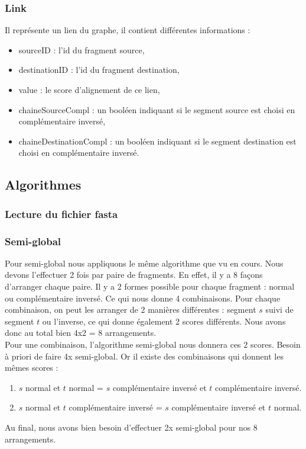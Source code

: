 \documentclass{article}
\begin{document}
\subsubsection{Link}
Il représente un lien du graphe, il contient différentes informations :
\begin{itemize}
\item sourceID : l'id du fragment source,
\item destinationID : l'id du fragment destination,
\item value : le score d'alignement de ce lien,
\item chaineSourceCompl : un booléen indiquant si le segment source est choisi en complémentaire inversé,
\item chaineDestinationCompl : un booléen indiquant si le segment destination est choisi en complémentaire inversé.
\end{itemize}


\subsection{Algorithmes}
\subsubsection{Lecture du fichier fasta}

\subsubsection{Semi-global}
Pour semi-global nous appliquons le même algorithme que vu en cours. Nous devons l'effectuer 2 fois par paire de fragments. En effet, il y a 8 façons d'arranger chaque paire. Il y a 2 formes possible pour chaque fragment : normal ou complémentaire inversé. Ce qui nous donne 4 combinaisons. Pour chaque combinaison, on peut les arranger de 2 manières différentes : segment $s$ suivi de segment $t$ ou l'inverse, ce qui donne également 2 scores différents. Nous avons donc au total bien 4x2 = 8 arrangements. \\

Pour une combinaison, l'algorithme semi-global nous donnera ces 2 scores. Besoin à priori de faire 4x semi-global. Or il existe des combinaisons qui donnent les mêmes scores : 
\begin{enumerate}
\item $s$ normal et $t$ normal = $s$ complémentaire inversé et $t$ complémentaire inversé.
\item $s$ normal et $t$ complémentaire inversé = $s$ complémentaire inversé et $t$ normal.
\end{enumerate}
Au final, nous avons bien besoin d'effectuer 2x semi-global pour nos 8 arrangements.
\end{document}
